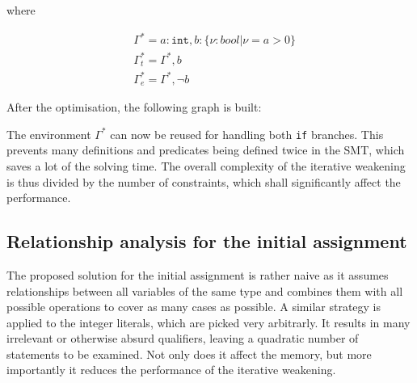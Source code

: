 where

\begin{align*}
  & \Gamma^* = a : \texttt{int}, b : \{\nu : bool | \nu = a > 0\}\\
  & \Gamma^*_t = \Gamma^*, b\\
  & \Gamma^*_e = \Gamma^*, \lnot b
\end{align*}

After the optimisation, the following graph is built:

\begin{adjustbox}{margin=0 30 0 30}
\end{adjustbox}

The environment $\Gamma^*$ can now be reused for handling both \texttt{if}
branches. This prevents many definitions and predicates being defined twice in
the SMT, which saves a lot of the solving time. The overall complexity of the
iterative weakening is thus divided by the number of constraints, which shall
significantly affect the performance.

\subsection{Relationship analysis for the initial assignment}

The proposed solution for the initial assignment is rather naive as it assumes
relationships between all variables of the same type and combines them with all
possible operations to cover as many cases as possible. A similar strategy is
applied to the integer literals, which are picked very arbitrarly. It results in
many irrelevant or otherwise absurd qualifiers, leaving a quadratic number of
statements to be examined. Not only does it affect the memory, but more
importantly it reduces the performance of the iterative weakening.

